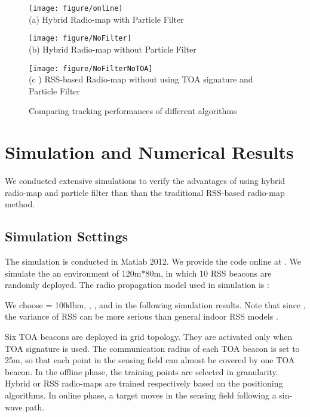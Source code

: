 \documentclass[conference, 10pt]{IEEEtran}
\begin{document}
\begin{figure*}[t]
  \begin{minipage}[t]{0.33\linewidth} 
    \centering 
    \texttt{[image: figure/online]} \\
    (a) Hybrid Radio-map with Particle Filter
  \end{minipage}\begin{minipage}[t]{0.33\linewidth} 
    \centering 
    \texttt{[image: figure/NoFilter]} \\
   (b) Hybrid Radio-map without Particle Filter
  \end{minipage}\begin{minipage}[t]{0.33\linewidth} 
    \centering 
    \texttt{[image: figure/NoFilterNoTOA]} \\
    (c ) RSS-based Radio-map without using TOA signature and Particle Filter
  \end{minipage}\caption{Comparing tracking performances of different algorithms}
    \label{fig6}
\end{figure*}
\section{Simulation and Numerical Results} 
We conducted extensive simulations to verify the advantages of using hybrid radio-map and particle filter than than the traditional RSS-based radio-map method. 
\subsection{Simulation Settings}
The simulation is conducted in Matlab 2012. We provide the code online at \cite{yc}. We simulate the an environment of 120m*80m, in which 10 RSS beacons are randomly deployed. The radio propagation model used in simulation is \cite{lo_adaptive_2012}:

We choose  = 100dbm, , , and    in the following simulation results.  Note that since ,  the variance of RSS can be more serious than general indoor RSS models \cite{bahl_radar:_2000}. 
 
Six TOA beacons are deployed in grid topology. They are activated only when TOA signature is used. The communication radius of each TOA beacon is set to 25m, so that each point in the sensing field can almost be covered by one TOA beacon.  In the offline phase, the training points are selected in  granularity. Hybrid or RSS radio-maps are trained respectively based on the positioning algorithms.  In online phase, a target moves in the sensing field following a sin-wave path. 
\end{document}
